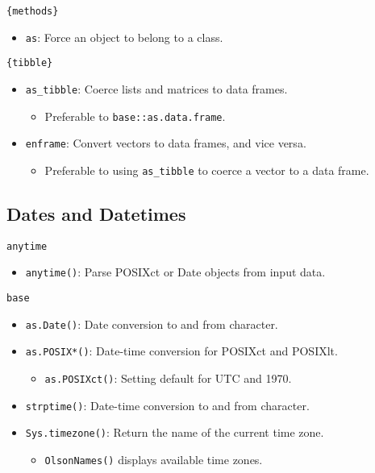 \documentclass[]{book}
\providecommand{\tightlist}{%
  \setlength{\itemsep}{0pt}\setlength{\parskip}{0pt}}
\begin{document}
\texttt{\{methods\}}

\begin{itemize}
\tightlist
\item
  \texttt{as}: Force an object to belong to a class.
\end{itemize}

\texttt{\{tibble\}}

\begin{itemize}
\tightlist
\item
  \texttt{as\_tibble}: Coerce lists and matrices to data frames.

  \begin{itemize}
  \tightlist
  \item
    Preferable to \texttt{base::as.data.frame}.
  \end{itemize}
\item
  \texttt{enframe}: Convert vectors to data frames, and vice versa.

  \begin{itemize}
  \tightlist
  \item
    Preferable to using \texttt{as\_tibble} to coerce a vector to a data frame.
  \end{itemize}
\end{itemize}

\hypertarget{dates-and-datetimes}{%
\subsection{Dates and Datetimes}\label{dates-and-datetimes}}

\texttt{anytime}

\begin{itemize}
\tightlist
\item
  \texttt{anytime()}: Parse POSIXct or Date objects from input data.
\end{itemize}

\texttt{base}

\begin{itemize}
\tightlist
\item
  \texttt{as.Date()}: Date conversion to and from character.
\item
  \texttt{as.POSIX*()}: Date-time conversion for POSIXct and POSIXlt.

  \begin{itemize}
  \tightlist
  \item
    \texttt{as.POSIXct()}: Setting default for UTC and 1970.
  \end{itemize}
\item
  \texttt{strptime()}: Date-time conversion to and from character.
\item
  \texttt{Sys.timezone()}: Return the name of the current time zone.

  \begin{itemize}
  \tightlist
  \item
    \texttt{OlsonNames()} displays available time zones.
  \end{itemize}
\end{itemize}
\end{document}
